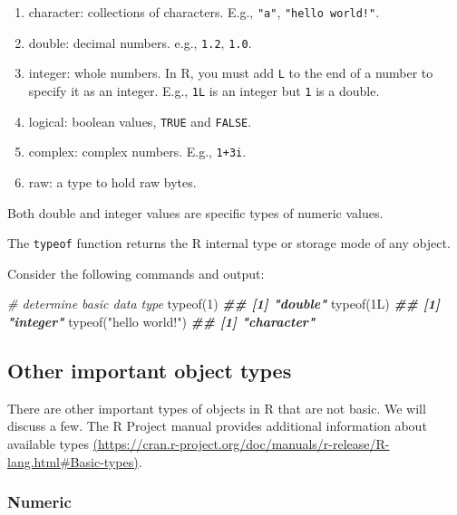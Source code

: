 \documentclass[
]{book}
\newenvironment{Shaded}{\begin{snugshade}}{\end{snugshade}}
\newcommand{\CommentTok}[1]{\textcolor[rgb]{0.56,0.35,0.01}{\textit{#1}}}
\newcommand{\DecValTok}[1]{\textcolor[rgb]{0.00,0.00,0.81}{#1}}
\newcommand{\DocumentationTok}[1]{\textcolor[rgb]{0.56,0.35,0.01}{\textbf{\textit{#1}}}}
\newcommand{\FunctionTok}[1]{\textcolor[rgb]{0.00,0.00,0.00}{#1}}
\newcommand{\NormalTok}[1]{#1}
\newcommand{\StringTok}[1]{\textcolor[rgb]{0.31,0.60,0.02}{#1}}
\providecommand{\tightlist}{%
  \setlength{\itemsep}{0pt}\setlength{\parskip}{0pt}}
\theoremstyle{definition}
\theoremstyle{definition}
\theoremstyle{definition}
\theoremstyle{definition}
\theoremstyle{remark}
\begin{document}
\begin{enumerate}
\def\labelenumi{\arabic{enumi}.}
\tightlist
\item
  character: collections of characters. E.g., \texttt{"a"}, \texttt{"hello\ world!"}.
\item
  double: decimal numbers. e.g., \texttt{1.2}, \texttt{1.0}.
\item
  integer: whole numbers. In R, you must add \texttt{L} to the end of a number to specify it as an integer. E.g., \texttt{1L} is an integer but \texttt{1} is a double.
\item
  logical: boolean values, \texttt{TRUE} and \texttt{FALSE}.
\item
  complex: complex numbers. E.g., \texttt{1+3i}.
\item
  raw: a type to hold raw bytes.
\end{enumerate}

Both double and integer values are specific types of numeric values.

The \texttt{typeof} function returns the R internal type or storage mode of any object.

Consider the following commands and output:

\begin{Shaded}
\begin{Highlighting}[]
\CommentTok{\# determine basic data type}
\FunctionTok{typeof}\NormalTok{(}\DecValTok{1}\NormalTok{)}
\DocumentationTok{\#\# [1] "double"}
\FunctionTok{typeof}\NormalTok{(1L)}
\DocumentationTok{\#\# [1] "integer"}
\FunctionTok{typeof}\NormalTok{(}\StringTok{"hello world!"}\NormalTok{)}
\DocumentationTok{\#\# [1] "character"}
\end{Highlighting}
\end{Shaded}

\hypertarget{other-important-object-types}{%
\subsection{Other important object types}\label{other-important-object-types}}

There are other important types of objects in R that are not basic. We will discuss a few. The R Project manual provides additional information about available types \href{https://cran.r-project.org/doc/manuals/r-release/R-lang.html\#Basic-types}{(https://cran.r-project.org/doc/manuals/r-release/R-lang.html\#Basic-types)}.

\hypertarget{numeric}{%
\subsubsection{Numeric}\label{numeric}}
\end{document}
